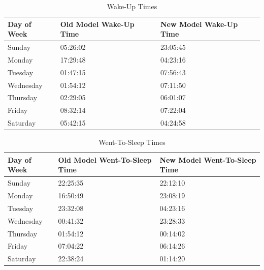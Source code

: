 \documentclass[A4,10pt]{article}
\begin{document}
\begin{table}[H]
\centering
\begin{tabular}{|l|l|l|}
\hline
\textbf{Day of Week} & \textbf{Old Model Wake-Up Time} & \textbf{New Model Wake-Up Time} \\ \hline
Sunday    & 05:26:02 & 23:05:45 \\ \hline
Monday    & 17:29:48 & 04:23:16 \\ \hline
Tuesday   & 01:47:15 & 07:56:43 \\ \hline
Wednesday & 01:54:12 & 07:11:50 \\ \hline
Thursday  & 02:29:05 & 06:01:07 \\ \hline
Friday    & 08:32:14 & 07:22:04 \\ \hline
Saturday  & 05:42:15 & 04:24:58 \\ \hline
\end{tabular}
\caption{Wake-Up Times}
\end{table}


\begin{table}[H]
\centering
\begin{tabular}{|l|l|l|}
\hline
\textbf{Day of Week} & \textbf{Old Model Went-To-Sleep Time} & \textbf{New Model Went-To-Sleep Time} \\ \hline
Sunday    & 22:25:35 & 22:12:10 \\ \hline
Monday    & 16:50:49 & 23:08:19 \\ \hline
Tuesday   & 23:32:08 & 04:23:16 \\ \hline
Wednesday & 00:41:32 & 23:28:33 \\ \hline
Thursday  & 01:54:12 & 00:14:02 \\ \hline
Friday    & 07:04:22 & 06:14:26 \\ \hline
Saturday  & 22:38:24 & 01:14:20 \\ \hline
\end{tabular}
\caption{Went-To-Sleep Times}
\end{table}
\end{document}
